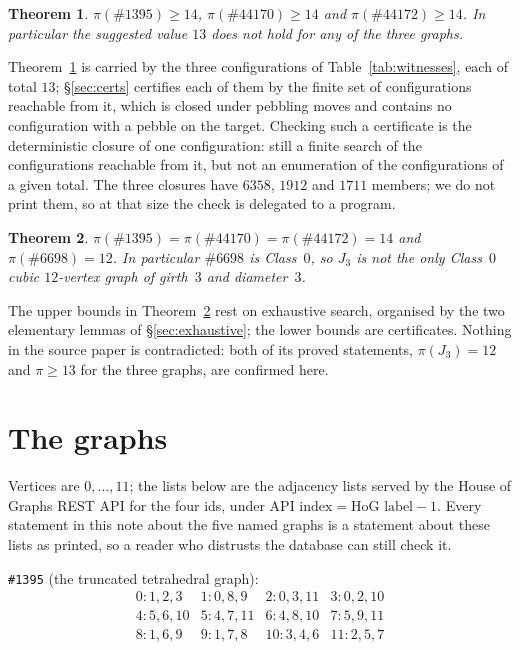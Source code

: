 \documentclass[11pt]{amsart}
\newtheorem{theorem}{Theorem}
\theoremstyle{remark}
\newcommand{\HoG}[1]{\#\mathrm{#1}}
\begin{document}
\begin{theorem}\label{thm:13}
$\pi(\HoG{1395})\ge14$, $\pi(\HoG{44170})\ge14$ and $\pi(\HoG{44172})\ge14$. In
particular the suggested value $13$ does not hold for any of the three graphs.
\end{theorem}

Theorem~\ref{thm:13} is carried by the three configurations of
Table~\ref{tab:witnesses}, each of total $13$; \S\ref{sec:certs} certifies each
of them by the finite set of configurations reachable from it, which is closed
under pebbling moves and contains no configuration with a pebble on the target.
Checking such a certificate is the deterministic closure of one configuration:
still a finite search of the configurations reachable from it, but not an
enumeration of the configurations of a given total. The three closures
have $6358$, $1912$ and $1711$ members; we do not print them, so at that size the
check is delegated to a program.

\begin{theorem}\label{thm:exact}
$\pi(\HoG{1395})=\pi(\HoG{44170})=\pi(\HoG{44172})=14$ and
$\pi(\HoG{6698})=12$. In particular $\HoG{6698}$ is Class~$0$, so $J_3$ is
\emph{not} the only Class~$0$ cubic $12$-vertex graph of girth~$3$ and
diameter~$3$.
\end{theorem}

The upper bounds in Theorem~\ref{thm:exact} rest on exhaustive search, organised
by the two elementary lemmas of \S\ref{sec:exhaustive}; the lower bounds are
certificates. Nothing in the source paper is contradicted: both of its proved
statements, $\pi(J_3)=12$ and $\pi\ge13$ for the three graphs, are confirmed
here.

\section{The graphs}\label{sec:graphs}

Vertices are $0,\dots,11$; the lists below are the adjacency lists served by the
House of Graphs REST API for the four ids, under
$\text{API index}=\text{HoG label}-1$. Every statement in this note about the five
named graphs is a statement about these lists as printed, so a reader who
distrusts the database can still check it.

\medskip
\noindent\texttt{\#1395} (the truncated tetrahedral graph):
\[\begin{array}{llll}
 0\colon 1,2,3 & 1\colon 0,8,9 & 2\colon 0,3,11 & 3\colon 0,2,10\\
 4\colon 5,6,10 & 5\colon 4,7,11 & 6\colon 4,8,10 & 7\colon 5,9,11\\
 8\colon 1,6,9 & 9\colon 1,7,8 & 10\colon 3,4,6 & 11\colon 2,5,7
\end{array}\]
\end{document}
